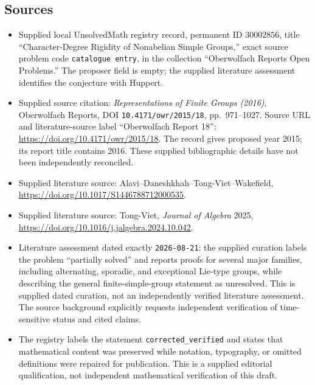 \documentclass[11pt]{article}
\begin{document}
\subsection{Sources}
\begin{itemize}
\item Supplied local UnsolvedMath registry record, permanent ID \(30002856\), title ``Character-Degree Rigidity of Nonabelian Simple Groups,'' exact source problem code \texttt{catalogue entry}, in the collection ``Oberwolfach Reports Open Problems.'' The proposer field is empty; the supplied literature assessment identifies the conjecture with Huppert.
\item Supplied source citation: \emph{Representations of Finite Groups (2016)}, Oberwolfach Reports, DOI \texttt{10.4171/owr/2015/18}, pp.\ 971--1027. Source URL and literature-source label ``Oberwolfach Report 18'': \url{https://doi.org/10.4171/owr/2015/18}. The record gives proposed year 2015; its report title contains 2016. These supplied bibliographic details have not been independently reconciled.
\item Supplied literature source: Alavi--Daneshkhah--Tong-Viet--Wakefield, \url{https://doi.org/10.1017/S1446788712000535}.
\item Supplied literature source: Tong-Viet, \emph{Journal of Algebra} 2025, \url{https://doi.org/10.1016/j.jalgebra.2024.10.042}.
\item Literature assessment dated exactly \texttt{2026-08-21}: the supplied curation labels the problem ``partially solved'' and reports proofs for several major families, including alternating, sporadic, and exceptional Lie-type groups, while describing the general finite-simple-group statement as unresolved. This is supplied dated curation, not an independently verified literature assessment. The source background explicitly requests independent verification of time-sensitive status and cited claims.
\item The registry labels the statement \texttt{corrected\_verified} and states that mathematical content was preserved while notation, typography, or omitted definitions were repaired for publication. This is a supplied editorial qualification, not independent mathematical verification of this draft.
\end{itemize}
\end{document}
